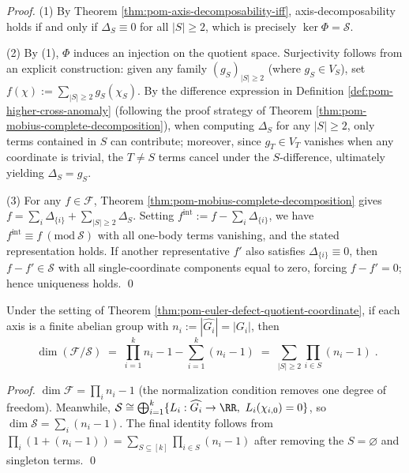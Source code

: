 \begin{proof}
(1) By Theorem \ref{thm:pom-axis-decomposability-iff}, axis-decomposability holds if and only if \(\Delta_S\equiv 0\) for all \(|S|\ge 2\), which is precisely \(\ker\Phi=\mathcal{S}\).
\par
(2) By (1), \(\Phi\) induces an injection on the quotient space.
Surjectivity follows from an explicit construction: given any family \((g_S)_{|S|\ge 2}\) (where \(g_S\in V_S\)), set
\(
f(\chi):=\sum_{|S|\ge 2} g_S(\chi_S)
\).
By the difference expression in Definition \ref{def:pom-higher-cross-anomaly} (following the proof strategy of Theorem \ref{thm:pom-mobius-complete-decomposition}), when computing \(\Delta_S\) for any \(|S|\ge 2\), only terms contained in \(S\) can contribute; moreover, since \(g_T\in V_T\) vanishes when any coordinate is trivial, the \(T\neq S\) terms cancel under the \(S\)-difference, ultimately yielding \(\Delta_S=g_S\).
\par
(3) For any \(f\in\mathcal{F}\), Theorem \ref{thm:pom-mobius-complete-decomposition} gives
\(
f=\sum_{i}\Delta_{\{i\}}+\sum_{|S|\ge 2}\Delta_S
\).
Setting
\(
f^{\mathrm{int}}:=f-\sum_i \Delta_{\{i\}}
\),
we have \(f^{\mathrm{int}}\equiv f\ (\mathrm{mod}\ \mathcal{S})\) with all one-body terms vanishing, and the stated representation holds.
If another representative \(f'\) also satisfies \(\Delta_{\{i\}}\equiv 0\), then \(f-f'\in\mathcal{S}\) with all single-coordinate components equal to zero, forcing \(f-f'=0\); hence uniqueness holds. \qed
\end{proof}

\begin{corollary}\label{cor:pom-euler-defect-dimension-formula}
Under the setting of Theorem \ref{thm:pom-euler-defect-quotient-coordinate}, if each axis is a finite abelian group with
\(
n_i:=|\widehat{G_i}|=|G_i|
\), then
\[
\boxed{\;
\dim(\mathcal{F}/\mathcal{S})
\;=\;
\prod_{i=1}^k n_i - 1 - \sum_{i=1}^k (n_i-1)
\;=\;
\sum_{|S|\ge 2}\prod_{i\in S}(n_i-1)\; }.
\]
\end{corollary}
\begin{proof}
\(\dim\mathcal{F}=\prod_i n_i-1\) (the normalization condition removes one degree of freedom).
Meanwhile, \(\mathcal{S}\cong\bigoplus_{i=1}^k\{L_i:\widehat{G_i}\to\RR,\ L_i(\chi_{i,0})=0\}\), so
\(\dim\mathcal{S}=\sum_i(n_i-1)\).
The final identity follows from
\(
\prod_i(1+(n_i-1))=\sum_{S\subseteq[k]}\prod_{i\in S}(n_i-1)
\)
after removing the \(S=\varnothing\) and singleton terms. \qed
\end{proof}


